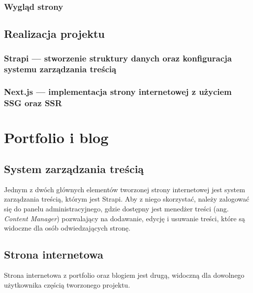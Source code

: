 \documentclass[12pt]{article}
\numberwithin{figure}{section}
\begin{document}
\begin{sloppypar}
\subsubsection*{Wygląd strony}





\subsection{Realizacja projektu} \label{realizacja}

\subsubsection{Strapi --- stworzenie struktury danych oraz konfiguracja systemu zarządzania treścią}

\subsubsection{Next.js --- implementacja strony internetowej z użyciem SSG oraz SSR}


\newpage

\section{Portfolio i blog}


\subsection{System zarządzania treścią}

Jednym z dwóch głównych elementów tworzonej strony internetowej jest system zarządzania treścią, którym jest Strapi. Aby z niego skorzystać, należy zalogować się do panelu administracyjnego, gdzie dostępny jest menedżer treści (ang. \textit{Content Manager}) pozwalający na dodawanie, edycję i usuwanie treści, które są widoczne dla osób odwiedzających stronę. 


\subsection{Strona internetowa}

Strona internetowa z portfolio oraz blogiem jest drugą, widoczną dla dowolnego użytkownika częścią tworzonego projektu. 


\end{sloppypar}
\end{document}
